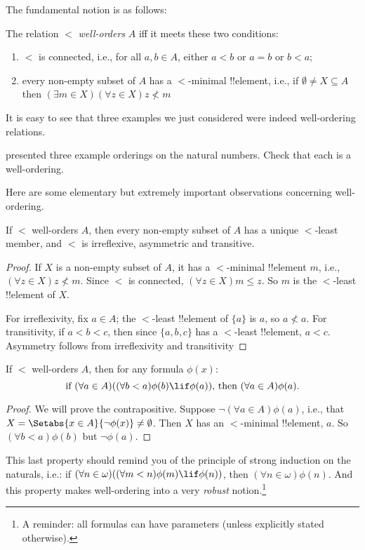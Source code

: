 \documentclass[../../../include/open-logic-section]{subfiles}
\begin{document}

The fundamental notion is as follows:

\begin{defn}
The relation $<$ \emph{well-orders} $A$ iff it meets these two conditions:
\begin{enumerate}
	\item $<$ is connected, i.e., for all $a, b \in A$, either $a < b$
	or $a = b$ or $b < a$;
	\item every non-empty subset of $A$ has a $<$-minimal !!{element},
	i.e., if $\emptyset \neq X \subseteq A$ then $(\exists m \in
	X)(\forall z \in X)z \nless m$
\end{enumerate}
\end{defn}

It is easy to see that three examples we just considered were indeed
well-ordering relations. 

\begin{prob}
 presented three example orderings
on the natural numbers. Check that each is a well-ordering.
\end{prob}

Here are some elementary but extremely important observations
concerning well-ordering.

\begin{prop}
If $<$ well-orders $A$, then every non-empty subset of $A$ has a unique
$<$-least member, and $<$ is irreflexive, asymmetric and transitive.
\end{prop}

\begin{proof}
If $X$ is a non-empty subset of $A$, it has a $<$-minimal !!{element}
$m$, i.e., $(\forall z \in X)z \nless m$. Since $<$ is connected,
$(\forall z \in X)m \leq z$. So $m$ is the $<$-least !!{element} of $X$.

For irreflexivity, fix $a \in A$; the $<$-least !!{element} of $\{a\}$ is $a$, so $a \nless a$. For transitivity, if $a < b < c$, then
since $\{a, b, c\}$ has a $<$-least !!{element}, $a < c$. Asymmetry
follows from irreflexivity and transitivity
\end{proof}

\begin{prop}
If $<$ well-orders $A$, then for any formula $\phi(x)$:
\[
	\text{if }(\forall a \in A)((\forall b < a)\phi(b) \lif 
		\phi(a))\text{, then }(\forall a \in A)\phi(a).
\]
\end{prop}

\begin{proof}
We will prove the contrapositive. Suppose $\lnot(\forall a \in
A)\phi(a)$, i.e., that $X = \Setabs{x \in A}{\lnot\phi(x)} \neq
\emptyset$. Then $X$ has an $<$-minimal !!{element}, $a$. So $(\forall
b < a)\phi(b)$ but $\lnot \phi(a)$. \end{proof}\noindent This last
property should remind you of the principle of strong induction on the
naturals, i.e.: if $(\forall n \in \omega)((\forall m < n)\phi(m)
\lif \phi(n))$, then $(\forall n \in \omega)\phi(n)$. And this
property makes well-ordering into a very \emph{robust} notion.\footnote{A reminder: all formulas can have parameters (unless explicitly stated otherwise).} 
\end{document}

